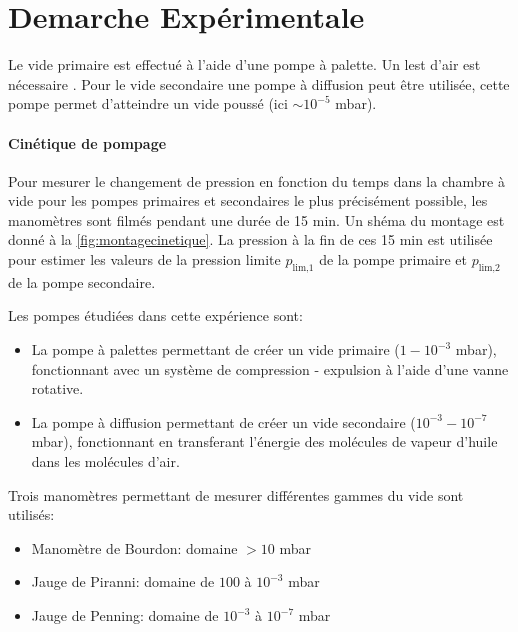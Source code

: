 \section{Demarche Expérimentale}

Le vide primaire est effectué à l'aide d'une pompe à palette. Un lest d'air est nécessaire . Pour le vide secondaire une pompe à diffusion peut être utilisée, cette pompe  permet d'atteindre un vide poussé (ici \(\sim 10^{-5}\) mbar).
\paragraph*{Cinétique de pompage}
Pour mesurer le changement de pression en fonction du temps dans la chambre à vide pour les pompes primaires et secondaires le plus précisément possible, les manomètres sont filmés pendant une durée de 15 \unit{\minute}. Un shéma du montage est donné à la \autoref{fig:montagecinetique}. La pression à la fin de ces 15 \unit{\minute} est utilisée pour estimer les valeurs de la pression limite \(p_\textrm{lim,1}\) de la pompe primaire et \(p_\textrm{lim,2}\) de la pompe secondaire.

Les pompes étudiées dans cette expérience sont:

\begin{itemize}
    \item La pompe à palettes permettant de créer un vide primaire (\(1 - 10^{-3}\) \unit{\milli\bar}), fonctionnant avec un système de compression - expulsion à l'aide d'une vanne rotative.
    \item La pompe à diffusion permettant de créer un vide secondaire (\(10^{-3} - 10^{-7}\) \unit{\milli\bar}), fonctionnant en transferant l'énergie des molécules de vapeur d'huile dans les molécules d'air.
\end{itemize}

Trois manomètres permettant de mesurer différentes gammes du vide sont utilisés:

\begin{itemize}
    \item Manomètre de Bourdon: domaine \(> 10\) \unit{\milli\bar}
    \item Jauge de Piranni: domaine de \(100\) à \(10^{-3}\) \unit{\milli\bar}
    \item Jauge de Penning: domaine de \(10^{-3}\) à \(10^{-7}\) \unit{\milli\bar}
\end{itemize}

